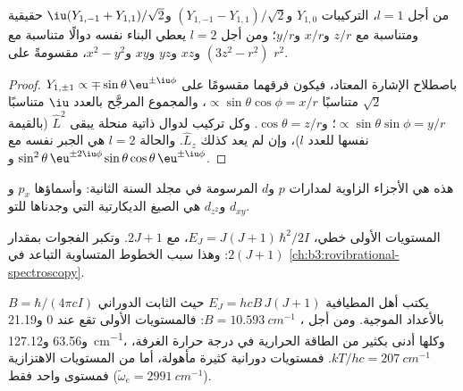 \begin{proposition}\label{prop:b3:quantum-model-systems:real-harmonics}
من أجل $l = 1$، التركيبات $Y_{1,0}$ و$(Y_{1,-1} - Y_{1,1})/\sqrt2$
و$\iu(Y_{1,-1} + Y_{1,1})/\sqrt2$ حقيقية ومتناسبة مع $z/r$ و$x/r$
و$y/r$؛ ومن أجل $l = 2$ يعطي البناء نفسه دوالًا متناسبة مع
$(3z^2 - r^2)$ و$xz$ و$yz$ و$xy$ و$x^2 - y^2$، مقسومةً على $r^2$.
\end{proposition}

\begin{proof}
$Y_{1,\pm1} \propto \mp\sin\theta\,\eu^{\pm\iu\phi}$ باصطلاح الإشارة
المعتاد، فيكون فرقهما مقسومًا على $\sqrt2$ متناسبًا $\propto\sin\theta\cos\phi =
x/r$، والمجموع المرجَّح بالعدد $\iu$ متناسبًا $\propto\sin\theta\sin\phi = y/r$؛
و$\cos\theta = z/r$. وكل تركيب لدوال ذاتية منحلة يبقى   $\hat L^2$ (بالقيمة نفسها للعدد $l$)، وإن لم يعد كذلك  $\hat
L_z$. والحالة $l = 2$ هي الجبر نفسه مع $\sin^2\theta\,\eu^{\pm2\iu\phi}$
و$\sin\theta\cos\theta\,\eu^{\pm\iu\phi}$.
\end{proof}

هذه هي الأجزاء الزاوية لمدارات $p$ و$d$ المرسومة في مجلد السنة
الثانية: وأسماؤها $p_x$ و$d_{xy}$ و$d_{z^2}$ هي الصيغ الديكارتية التي
وجدناها للتو.

\begin{omfigure}

{\small المستويات الأولى  خطي، $E_J = J(J+1)\,\hbar^2/2I$،
مع  $2J + 1$. وتكبر الفجوات بمقدار $2(J+1)$: وهذا سبب
الخطوط المتساوية التباعد في \cref{ch:b3:rovibrational-spectroscopy}.}
\end{omfigure}

\begin{example}\label{ex:b3:quantum-model-systems:hcl}
يكتب أهل المطيافية $E_J = hcB\,J(J+1)$ حيث الثابت الدوراني $B =
\hbar/(4\pi cI)$ بالأعداد الموجية. ومن أجل ، $B = \qty{10.593}{cm^{-1}}$:
فالمستويات الأولى تقع عند 0 و21.19 و63.56 و\qty{127.12}{cm^{-1}}، وكلها أدنى بكثير
من الطاقة الحرارية في درجة حرارة الغرفة، $kT/hc = \qty{207}{cm^{-1}}$.
فمستويات دورانية كثيرة مأهولة، أما من المستويات الاهتزازية فمستوى واحد فقط
($\tilde\omega_e = \qty{2991}{cm^{-1}}$).
\end{example}

